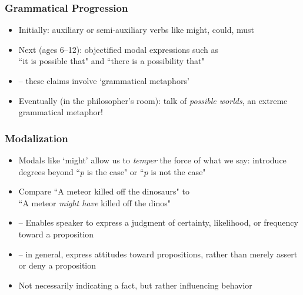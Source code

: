 \begin{frame}
\frametitle{Grammatical Progression}

\begin{itemize}[<+->]

\item Initially: auxiliary or semi-auxiliary verbs like might, could, must

\item Next (ages 6--12): objectified modal expressions such as \\  ``it is possible that" and ``there is a possibility that"
\item[] -- these claims involve `grammatical metaphors'

\item Eventually (in the philosopher's room): talk of \textit{possible worlds}, an extreme grammatical metaphor!

\end{itemize}
\end{frame}

\begin{frame}
\frametitle{Modalization}

\begin{itemize}[<+->]

\item Modals like `might' allow us to \textit{temper} the force of what we say: introduce degrees beyond ``$p$ is the case" or ``$p$ is not the case"

\item Compare ``A meteor killed off the dinosaurs" to \\ ``A meteor \textit{might have} killed off the dinos"

\item[] -- Enables speaker to express a judgment of certainty, likelihood, or frequency toward a proposition

\item[] -- in general, express attitudes toward propositions, rather than merely assert or deny a proposition 

\item Not necessarily indicating a fact, but rather influencing behavior

\end{itemize}
\end{frame}

